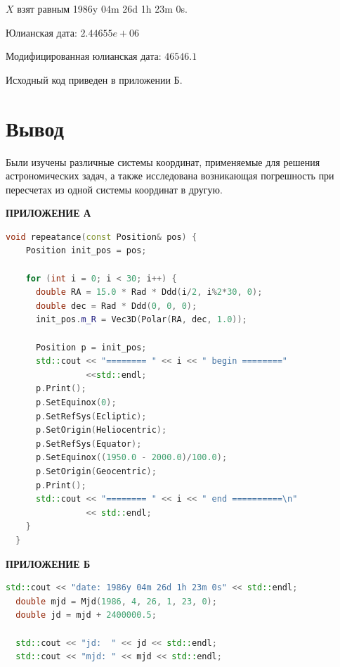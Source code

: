 \documentclass[14pt,a4paper]{extarticle}%
\begin{document}
$X$ взят равным 1986y 04m 26d 1h 23m 0s.

Юлианская дата: $2.44655e+06$

Модифицированная юлианская дата: $46546.1$

Исходный код приведен в приложении Б.


\section{Вывод}
Были изучены различные системы координат,
применяемые для решения астрономических задач,
а также исследована возникающая погрешность
при пересчетах из одной системы координат в другую.


\clearpage

\begin{center}
  \textbf{ПРИЛОЖЕНИЕ А}
\end{center}

\begin{lstlisting}[language=c++]
  void repeatance(const Position& pos) {
    Position init_pos = pos;
    
    for (int i = 0; i < 30; i++) {
      double RA = 15.0 * Rad * Ddd(i/2, i%2*30, 0);
      double dec = Rad * Ddd(0, 0, 0);
      init_pos.m_R = Vec3D(Polar(RA, dec, 1.0));

      Position p = init_pos;
      std::cout << "======== " << i << " begin ========"
                <<std::endl;
      p.Print();
      p.SetEquinox(0);
      p.SetRefSys(Ecliptic);
      p.SetOrigin(Heliocentric);
      p.SetRefSys(Equator);
      p.SetEquinox((1950.0 - 2000.0)/100.0);
      p.SetOrigin(Geocentric);
      p.Print();
      std::cout << "======== " << i << " end ==========\n"
                << std::endl;
    }
  }
\end{lstlisting}


\clearpage

\begin{center}
  \textbf{ПРИЛОЖЕНИЕ Б}
\end{center}

\begin{lstlisting}[language=c++]
  std::cout << "date: 1986y 04m 26d 1h 23m 0s" << std::endl;
  double mjd = Mjd(1986, 4, 26, 1, 23, 0);
  double jd = mjd + 2400000.5;

  std::cout << "jd:  " << jd << std::endl;
  std::cout << "mjd: " << mjd << std::endl;
\end{lstlisting}
\end{document}

